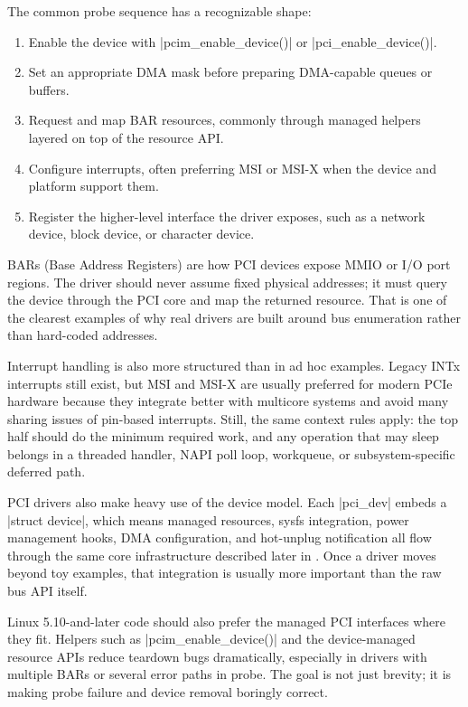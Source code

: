 \documentclass[10pt, oneside]{book}
\begin{document}
The common probe sequence has a recognizable shape:
\begin{enumerate}
  \item Enable the device with \cpp|pcim_enable_device()| or \cpp|pci_enable_device()|.
  \item Set an appropriate DMA mask before preparing DMA-capable queues or buffers.
  \item Request and map BAR resources, commonly through managed helpers layered on top of the resource API.
  \item Configure interrupts, often preferring MSI or MSI-X when the device and platform support them.
  \item Register the higher-level interface the driver exposes, such as a network device, block device, or character device.
\end{enumerate}

BARs (Base Address Registers) are how PCI devices expose MMIO or I/O port
regions.
The driver should never assume fixed physical addresses; it must query the
device through the PCI core and map the returned resource.
That is one of the clearest examples of why real drivers are built around bus
enumeration rather than hard-coded addresses.

Interrupt handling is also more structured than in ad hoc examples.
Legacy INTx interrupts still exist, but MSI and MSI-X are usually preferred for
modern PCIe hardware because they integrate better with multicore systems and
avoid many sharing issues of pin-based interrupts.
Still, the same context rules apply: the top half should do the minimum
required work, and any operation that may sleep belongs in a threaded handler,
NAPI poll loop, workqueue, or subsystem-specific deferred path.

PCI drivers also make heavy use of the device model.
Each \cpp|pci_dev| embeds a \cpp|struct device|, which means managed resources,
sysfs integration, power management hooks, DMA configuration, and hot-unplug
notification all flow through the same core infrastructure described later in
.
Once a driver moves beyond toy examples, that integration is usually more
important than the raw bus API itself.

Linux 5.10-and-later code should also prefer the managed PCI interfaces where they fit.
Helpers such as \cpp|pcim_enable_device()| and the device-managed resource
APIs reduce teardown bugs dramatically, especially in drivers with multiple BARs
or several error paths in probe.
The goal is not just brevity; it is making probe failure and device removal
boringly correct.
\end{document}
